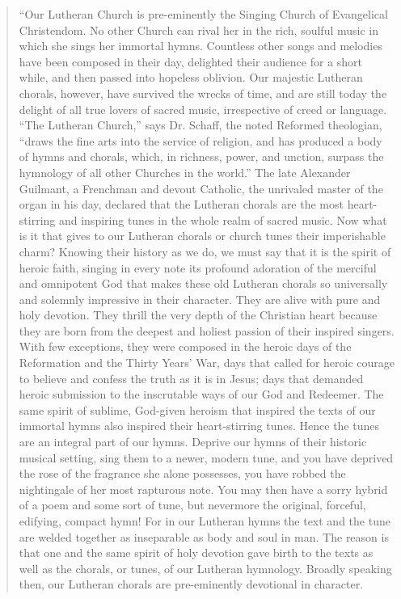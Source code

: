 \begin{quote}
“Our Lutheran Church is pre-eminently the Singing Church of Evangelical Christendom. No other Church can rival her in the rich, soulful music in which she sings her immortal hymns. Countless other songs and melodies have been composed in their day, delighted their audience for a short while, and then passed into hopeless oblivion. Our majestic Lutheran chorals, however, have survived the wrecks of time, and are still today the delight of all true lovers of sacred music, irrespective of creed or language. “The Lutheran Church,” says Dr. Schaff, the noted Reformed theologian, “draws the fine arts into the service of religion, and has produced a body of hymns and chorals, which, in richness, power, and unction, surpass the hymnology of all other Churches in the world.” The late Alexander Guilmant, a Frenchman and devout Catholic, the unrivaled master of the organ in his day, declared that the Lutheran chorals are the most heart-stirring and inspiring tunes in the whole realm of sacred music. Now what is it that gives to our Lutheran chorals or church tunes their imperishable charm? Knowing their history as we do, we must say that it is the spirit of heroic faith, singing in every note its profound adoration of the merciful and omnipotent God that makes these old Lutheran chorals so universally and solemnly impressive in their character. They are alive with pure and holy devotion. They thrill the very depth of the Christian heart because they are born from the deepest and holiest passion of their inspired singers. With few exceptions, they were composed in the heroic days of the Reformation and the Thirty Years’ War, days that called for heroic courage to believe and confess the truth as it is in Jesus; days that demanded heroic submission to the inscrutable ways of our God and Redeemer. The same spirit of sublime, God-given heroism that inspired the texts of our immortal hymns also inspired their heart-stirring tunes. Hence the tunes are an integral part of our hymns. Deprive our hymns of their historic musical setting, sing them to a newer, modern tune, and you have deprived the rose of the fragrance she alone possesses, you have robbed the nightingale
of her most rapturous note. You may then have a sorry hybrid of a poem and some sort of tune, but nevermore the original, forceful, edifying, compact hymn! For in our Lutheran hymns the text and the tune are welded together as inseparable as body and soul in man. The reason is that one and the same spirit of holy devotion gave birth to the texts as well as the chorals, or tunes, of our Lutheran hymnology. Broadly speaking then, our Lutheran chorals are pre-eminently devotional in character.


\end{quote}
